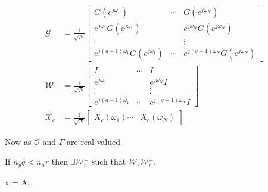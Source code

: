 \documentclass[10pt,a4paper]{scrartcl}
\begin{document}
\begin{multicols*}{2}
\newcommand{\Gejon}[1]{G(e^{j\omega_{#1}})}
\begin{align*}
\mathcal{G}&=\frac{1}{\sqrt{N}}\begin{bmatrix}
\Gejon{1}&\cdots&\Gejon{N}\\
e^{j\omega_1}\Gejon{1}&&e^{j\omega_N}\Gejon{N}\\
\vdots&&\vdots\\
e^{j(q-1)\omega_1}\Gejon{1}&\cdots&e^{j(q-1)\omega_N}\Gejon{N}
\end{bmatrix}\\
\mathcal{W}&=\frac{1}{\sqrt{N}}\begin{bmatrix}
I&\cdots&I\\
e^{j\omega_1}&&e^{j\omega_N}I\\
\vdots&&\vdots\\
e^{j(q-1)\omega_1}&\cdots&e^{j(q-1)\omega_N}I
\end{bmatrix}\\
\mathcal{X}_c&=\frac{1}{\sqrt{N}}\begin{bmatrix}
X_c(\omega_1)\cdots&X_c(\omega_N)
\end{bmatrix}
\end{align*}


Now as $\mathcal{O}$ and $\Gamma$ are real valued


If $n_yq<n_ur$ then $\exists\mathcal{W}_r^\perp$ such that $\mathcal{W}_r\mathcal{W}_r^\perp$.



\begin{TPMatlab}
x = A\b;
\end{TPMatlab}



\end{multicols*}
\end{document}
